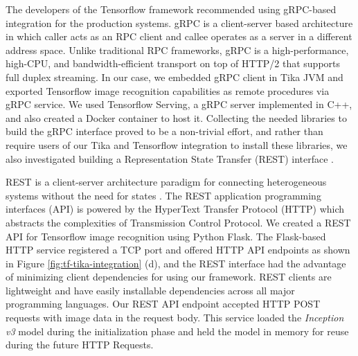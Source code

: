 The developers of the Tensorflow framework recommended using gRPC-based integration for the production systems\cite{goog-tfserve}. gRPC is a client-server based architecture in which caller acts as an RPC client and callee operates as a server in a different address space. Unlike traditional RPC frameworks, gRPC is a high-performance, high-CPU, and bandwidth-efficient transport on top of HTTP/2 that supports full duplex streaming\cite{about-grpc}. In our case, we embedded gRPC client in Tika JVM and exported Tensorflow image recognition capabilities as remote procedures via gRPC service. We used Tensorflow Serving, a gRPC server implemented in C++, and also created a Docker container to host it.  Collecting the needed libraries to build the gRPC interface proved to be a non-trivial effort, and rather than require users of our Tika and Tensorflow integration to install these libraries, we also investigated building a Representation State Transfer (REST) interface \cite{Fielding:2000:ASD:932295}.

REST is a client-server architecture paradigm for connecting heterogeneous systems without the need for states \cite[Chapter~5]{Fielding:2000:ASD:932295}. The REST application programming interfaces (API) is powered by the HyperText Transfer Protocol (HTTP) which abstracts the complexities of Transmission Control Protocol.
We created a REST API for Tensorflow image recognition using Python Flask. The Flask-based HTTP service registered a TCP port and offered HTTP API endpoints as shown in Figure \ref{fig:tf-tika-integration} (d), and the REST interface had the advantage of minimizing client dependencies for using our framework. REST clients are lightweight and have easily installable dependencies across all major programming languages. Our REST API endpoint accepted HTTP POST requests with image data in the request body. This service loaded the \textit{Inception v3} \cite{SzegedyVISW15} model during the initialization phase and held the model in memory for reuse during the future HTTP Requests.




